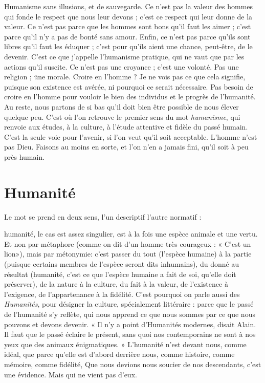 Humanisme sans illusions, et de sauvegarde. Ce n’est pas la valeur des hommes
qui fonde le respect que nous leur devons ; c’est ce respect qui leur donne de la
valeur. Ce n’est pas parce que les hommes sont bons qu’il faut les aimer ; c'est
parce qu’il n’y a pas de bonté sans amour. Enfin, ce n’est pas parce qu’ils sont
libres qu’il faut les éduquer ; c’est pour qu’ils aient une chance, peut-être, de le
devenir. C’est ce que j'appelle l’humanisme pratique, qui ne vaut que par les
actions qu’il suscite. Ce n’est pas une croyance ; c’est une volonté. Pas une
religion ; üne morale. Croire en l’homme ? Je ne vois pas ce que cela signifie,
puisque son existence est avérée, ni pourquoi ce serait nécessaire. Pas besoin de
croire en l’homme pour vouloir le bien des individus et le progrès de l’humanité.
Au reste, nous partons de si bas qu’il doit bien être possible de nous élever
quelque peu. C’est où l’on retrouve le premier sens du mot {\it humanisme}, qui
renvoie aux études, à la culture, à l’étude attentive et fidèle du passé humain.
C’est la seule voie pour l'avenir, si l’on veut qu’il soit acceptable. L'homme
n’est pas Dieu. Faisons au moins en sorte, et l’on n’en a jamais fini, qu’il soit à
peu près humain.

\section{Humanité}
Le mot se prend en deux sens, l’un descriptif l’autre normatif :

humanité, le cas est assez singulier, est à la fois une espèce
animale et une vertu. Et non par métaphore (comme on dit d’un homme très
courageux : « C’est un lion»), mais par métonymie: c’est passer du tout
(l'espèce humaine) à la partie (puisque certains membres de l’espèce seront dits
inhumains), du donné au résultat (humanité, c’est ce que l'espèce humaine a
fait de soi, qu’elle doit préserver), de la nature à la culture, du fait à la valeur,
de l’existence à l’exigence, de l’appartenance à la fidélité. C’est pourquoi on
parle aussi des {\it Humanités}, pour désigner la culture, spécialement littéraire :
parce que le passé de l'humanité s’y reflète, qui nous apprend ce que nous
sommes par ce que nous pouvons et devons devenir. « Il n’y a point d’Humanités
modernes, disait Alain. Il faut que le passé éclaire le présent, sans quoi nos
contemporains ne sont à nos yeux que des animaux énigmatiques. » L’humanité
n’est devant nous, comme idéal, que parce qu’elle est d’abord derrière
nous, comme histoire, comme mémoire, comme fidélité, Que nous devions
nous soucier de nos descendants, c’est une évidence. Mais qui ne vient pas
d’eux.

